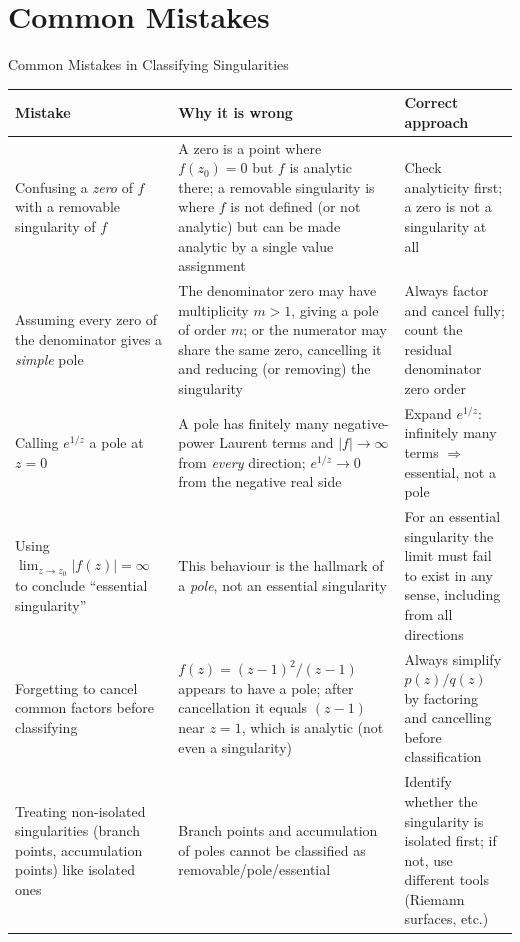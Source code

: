 \documentclass[12pt,a4paper]{article}
\begin{document}
\section{Common Mistakes}

\begin{mistakebox}{Common Mistakes in Classifying Singularities}
\begin{center}
\renewcommand{\arraystretch}{1.5}
\begin{tabular}{p{4.5cm} p{4.5cm} p{4.5cm}}
\toprule
\textbf{Mistake} & \textbf{Why it is wrong} & \textbf{Correct approach} \\
\midrule
Confusing a \emph{zero} of $f$ with a removable singularity of $f$ &
A zero is a point where $f(z_0)=0$ but $f$ is analytic there; a removable singularity is where
$f$ is not defined (or not analytic) but can be made analytic by a single value assignment &
Check analyticity first; a zero is not a singularity at all \\
\midrule
Assuming every zero of the denominator gives a \emph{simple} pole &
The denominator zero may have multiplicity $m > 1$, giving a pole of order $m$; or the numerator
may share the same zero, cancelling it and reducing (or removing) the singularity &
Always factor and cancel fully; count the residual denominator zero order \\
\midrule
Calling $e^{1/z}$ a pole at $z = 0$ &
A pole has finitely many negative-power Laurent terms and $|f|\to\infty$ from \emph{every}
direction; $e^{1/z} \to 0$ from the negative real side &
Expand $e^{1/z}$: infinitely many terms $\Rightarrow$ essential, not a pole \\
\midrule
Using $\lim_{z\to z_0}|f(z)| = \infty$ to conclude ``essential singularity'' &
This behaviour is the hallmark of a \emph{pole}, not an essential singularity &
For an essential singularity the limit must fail to exist in any sense, including from all
directions \\
\midrule
Forgetting to cancel common factors before classifying &
$f(z) = (z-1)^2/(z-1)$ appears to have a pole; after cancellation it equals $(z-1)$ near $z=1$,
which is analytic (not even a singularity) &
Always simplify $p(z)/q(z)$ by factoring and cancelling before classification \\
\midrule
Treating non-isolated singularities (branch points, accumulation points) like isolated ones &
Branch points and accumulation of poles cannot be classified as removable/pole/essential &
Identify whether the singularity is isolated first; if not, use different tools (Riemann surfaces,
etc.) \\
\bottomrule
\end{tabular}
\end{center}
\end{mistakebox}
\end{document}

